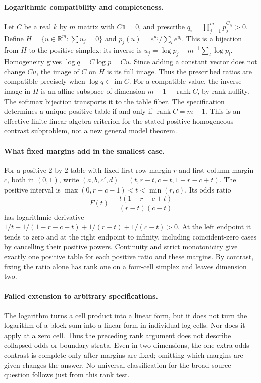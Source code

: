 \documentclass[11pt]{article}
\begin{document}
\paragraph{Logarithmic compatibility and completeness.}
Let $C$ be a real $k$ by $m$ matrix with $C\boldsymbol1=0$, and prescribe
$q_i=\prod_{j=1}^m p_j^{C_{ij}}>0$. Define
$H=\{u\in\mathbb R^m:\sum u_j=0\}$ and
$p_j(u)=e^{u_j}/\sum_l e^{u_l}$. This is a bijection from $H$ to the
positive simplex: its inverse is
$u_j=\log p_j-m^{-1}\sum_l\log p_l$.
Homogeneity gives $\log q=C\log p=Cu$. Since adding a constant vector
does not change $Cu$, the image of $C$ on $H$ is its full image. Thus
the prescribed ratios are compatible precisely when $\log q\in\operatorname{im}C$.
For a compatible value, the inverse image in $H$ is an affine subspace
of dimension $m-1-\operatorname{rank}C$, by rank-nullity.
The softmax bijection transports it to the table fiber. The specification
determines a unique positive table if and only if $\operatorname{rank}C=m-1$.
This is an effective finite linear-algebra criterion for the stated
positive homogeneous-contrast subproblem, not a new general model theorem.

\paragraph{What fixed margins add in the smallest case.}
For a positive $2$ by $2$ table with fixed first-row margin $r$ and
first-column margin $c$, both in $(0,1)$, write
$(a,b,c',d)=(t,r-t,c-t,1-r-c+t)$.
The positive interval is $\max(0,r+c-1)<t<\min(r,c)$.
Its odds ratio
\[
F(t)=\frac{t(1-r-c+t)}{(r-t)(c-t)}
\]
has logarithmic derivative
$1/t+1/(1-r-c+t)+1/(r-t)+1/(c-t)>0$.
At the left endpoint it tends to zero and at the right endpoint to infinity,
including coincident-zero cases by cancelling their positive powers.
Continuity and strict monotonicity give exactly one positive table for each
positive ratio and these margins. By contrast, fixing the ratio alone has
rank one on a four-cell simplex and leaves dimension two.

\paragraph{Failed extension to arbitrary specifications.}
The logarithm turns a cell product into a linear form, but it does not turn
the logarithm of a block sum into a linear form in individual log cells.
Nor does it apply at a zero cell. Thus the preceding rank argument does
not describe collapsed odds or boundary strata. Even in two dimensions,
the one extra odds contrast is complete only after margins are fixed;
omitting which margins are given changes the answer. No universal
classification for the broad source question follows just from this rank test.
\end{document}
